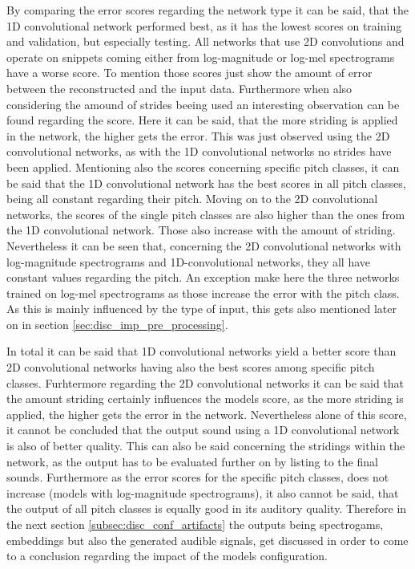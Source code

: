 By comparing the error scores regarding the network type it can be said, that the 1D convolutional network performed best, as it has the lowest scores on training and validation, but especially testing. All networks that use 2D convolutions and operate on snippets coming either from log-magnitude or log-mel spectrograms have a worse score. To mention those scores just show the amount of error between the reconstructed and the input data. Furthermore when also considering the amound of strides beeing used an interesting observation can be found regarding the score. Here it can be said, that the more striding is applied in the network, the higher gets the error. This was just observed using the 2D convolutional networks, as with the 1D convolutional networks no strides have been applied. Mentioning also the scores concerning specific pitch classes, it can be said that the 1D convolutional network has the best scores in all pitch classes, being all constant regarding their pitch. Moving on to the 2D convolutional networks, the scores of the single pitch classes are also higher than the ones from the 1D convolutional network. Those also increase with the amount of striding. Nevertheless it can be seen that, concerning the 2D convolutional networks with log-magnitude spectrograms and 1D-convolutional networks, they all have constant values regarding the pitch. An exception make here the three networks trained on log-mel spectrograms as those increase the error with the pitch class. As this is mainly influenced by the type of input, this gets also mentioned later on in section \ref{sec:disc_imp_pre_processing}. 

In total it can be said that 1D convolutional networks yield a better score than 2D convolutional networks having also the best scores among specific pitch classes. Furhtermore regarding the 2D convolutional networks it can be said that the amount striding certainly influences the models score, as the more striding is applied, the higher gets the error in the network. Nevertheless alone of this score, it cannot be concluded that the output sound using a 1D convolutional network is also of better quality. This can also be said concerning the stridings within the network, as the output has to be evaluated further on by listing to the final sounds. Furthermore as the error scores for the specific pitch classes, does not increase (models with log-magnitude spectrograms), it also cannot be said, that the output of all pitch classes is equally good in its auditory quality. Therefore in the next section \ref{subsec:disc_conf_artifacts} the outputs being spectrogams, embeddings but also the generated audible signals, get discussed in order to come to a conclusion regarding the impact of the models configuration.

